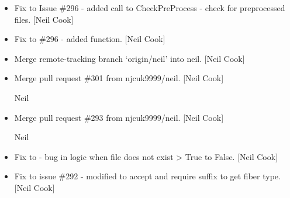 \documentclass[a4paper,10pt,english]{report}
\begin{document}
\begin{itemize}
\item {} 
Fix to Issue \#296 - added call to CheckPreProcess - check for
preprocessed files. {[}Neil Cook{]}

\item {} 
Fix to \#296 - added  function. {[}Neil Cook{]}

\item {} 
Merge remote-tracking branch ‘origin/neil’ into neil. {[}Neil Cook{]}

\item {} 
Merge pull request \#301 from njcuk9999/neil. {[}Neil Cook{]}

Neil

\item {} 
Merge pull request \#293 from njcuk9999/neil. {[}Neil Cook{]}

Neil

\item {} 
Fix to  - bug in logic when file does not exist \textendash{}\textgreater{} True to
False. {[}Neil Cook{]}

\item {} 
Fix to issue \#292 -  modified to accept and require
suffix to get fiber type. {[}Neil Cook{]}

\end{itemize}
\end{document}
